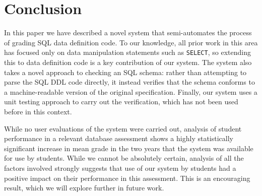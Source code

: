 \documentclass[sigconf, review, anonymous, capitalise]{acmart}
\begin{document}
\section{Conclusion}
\label{sec-conclusion}

In this paper we have described a novel system that semi-automates the process of grading SQL data definition code. To our knowledge, all prior work in this area has focused only on data manipulation statements such as \texttt{SELECT}, so extending this to data definition code is a key contribution of our system. The system also takes a novel approach to checking an SQL schema: rather than attempting to parse the SQL DDL code directly, it instead verifies that the schema conforms to a machine-readable version of the original specification. Finally, our system uses a unit testing approach to carry out the verification, which has not been used before in this context.

While no user evaluations of the system were carried out, analysis of student performance in a relevant database assessment shows a highly statistically significant increase in mean grade in the two years that the system was available for use by students. While we cannot be absolutely certain, analysis of all the factors involved strongly suggests that use of our system by students had a positive impact on their performance in this assessment. This is an encouraging result, which we will explore further in future work.




\end{document}
